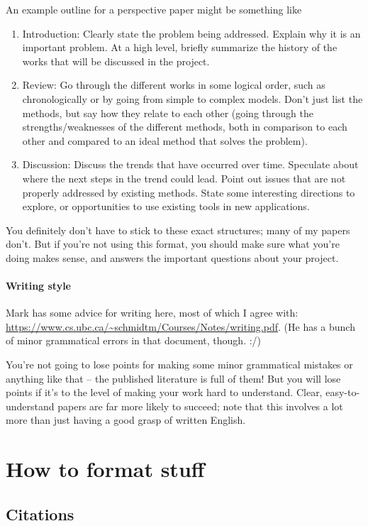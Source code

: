 \documentclass{article}
\begin{document}
An example outline for a perspective paper might be something like
\begin{enumerate}
\item Introduction: Clearly state the problem being addressed. Explain why it is an important problem. At a high level, briefly summarize the history of the works that will be discussed in the project.
\item Review: Go through the different works in some logical order, such as chronologically or by going from simple to complex models. Don't just list the methods, but say how they relate to each other (going through the strengths/weaknesses of the different methods, both in comparison to each other and compared to an ideal method that solves the problem).
\item Discussion: Discuss the trends that have occurred over time. Speculate about where the next steps in the trend could lead. Point out issues that are not properly addressed by existing methods. State some interesting directions to explore, or opportunities to use existing tools in new applications.
\end{enumerate}

You definitely don't have to stick to these exact structures; many of my papers don't.
But if you're not using this format, you should make sure what you're doing makes sense,
and answers the important questions about your project.

\paragraph{Writing style}
Mark has some advice for writing here, most of which I agree with:
\url{https://www.cs.ubc.ca/~schmidtm/Courses/Notes/writing.pdf}.
(He has a bunch of minor grammatical errors in that document, though. :/)

You're not going to lose points for making some minor grammatical mistakes or anything like that
-- the published literature is full of them!
But you will lose points if it's to the level of making your work hard to understand.
Clear, easy-to-understand papers are far more likely to succeed;
note that this involves a lot more than just having a good grasp of written English.


\section{How to format stuff}
\subsection{Citations}
\end{document}
